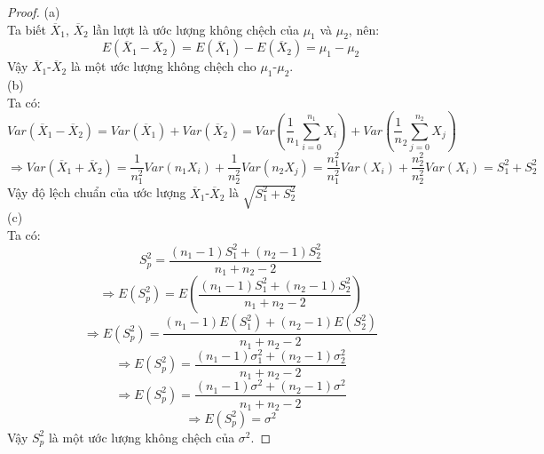 \begin{proof}
(a)\\
Ta biết $\overline{X}_1$, $\overline{X}_2$ lần lượt là ước lượng không chệch của $\mu_1$ và $\mu_2$, nên:
\begin{equation*}
{E(\overline{X}_1-\overline{X}_2) = E(\overline{X}_1)-E(\overline{X}_2) = \mu_1-\mu_2}
\end{equation*}
Vậy $\overline{X}_1$-$\overline{X}_2$ là một ước lượng không chệch cho $\mu_1$-$\mu_2$.\\
(b)\\
Ta có:
\begin{equation*}
Var(\overline{X}_1-\overline{X}_2) = Var\left(\overline{X}_1\right)+Var\left(\overline{X}_2\right) =  Var\left(\frac1n_1\sum_{i=0}^{n_1}X_i\right)+Var\left(\frac1n_2\sum_{j=0}^{n_2}X_j\right)
\end{equation*}
\begin{equation*}
\Rightarrow Var(\overline{X}_1+\overline{X}_2) = \frac{1}{n^2_1}Var(n_1X_i)+\frac{1}{n^2_2}Var(n_2X_j) = \frac{n^2_1}{n^2_1}Var(X_i)+\frac{n^2_2}{n^2_2}Var(X_i)= S^2_1 + S^2_2 
\end{equation*}
Vậy độ lệch chuẩn của ước lượng $\overline{X}_1$-$\overline{X}_2$ là $\sqrt{S^2_1 + S^2_2}$\\
(c)\\
Ta có:
\begin{equation*}
S^2_p = \dfrac{(n_1-1)S^2_1+(n_2-1)S^2_2}{n_1+n_2-2}
\end{equation*}
\begin{equation*}
\Rightarrow E(S^2_p) = E\left(\dfrac{(n_1-1)S^2_1+(n_2-1)S^2_2}{n_1+n_2-2}\right)
\end{equation*}
\begin{equation*}
\Rightarrow E(S^2_p) = \dfrac{(n_1-1)E(S^2_1)+(n_2-1)E(S^2_2)}{n_1+n_2-2}
\end{equation*}
\begin{equation*}
\Rightarrow E(S^2_p) = \dfrac{(n_1-1)\sigma_1^2+(n_2-1)\sigma_2^2}{n_1+n_2-2}
\end{equation*}
\begin{equation*}
\Rightarrow E(S^2_p) = \dfrac{(n_1-1)\sigma^2+(n_2-1)\sigma^2}{n_1+n_2-2} 
\end{equation*}
\begin{equation*}
\Rightarrow E(S^2_p) = \sigma^2
\end{equation*}
Vậy $S^2_p$ là một ước lượng không chệch của  $\sigma^2$.
\end{proof}
